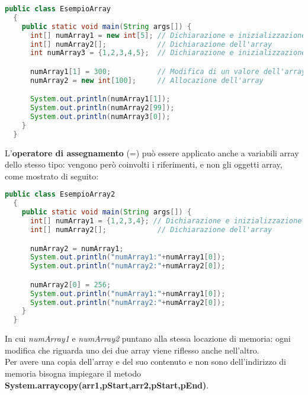 \documentclass[a4paper]{extarticle}
\begin{document}
\vspace{1em}
\noindent
\begin{lstlisting}[language=Java, caption=Esempio di array in Java]
  public class EsempioArray
  {
    public static void main(String args[]) {
      int[] numArray1 = new int[5]; // Dichiarazione e inizializzazione dell'array
      int[] numArray2[];            // Dichiarazione dell'array
      int numArray3 = {1,2,3,4,5};  // Dichiarazione e inizializzazione dell'array

      numArray1[1] = 300;           // Modifica di un valore dell'array
      numArray2 = new int[100];     // Allocazione dell'array

      System.out.println(numArray1[1]);
      System.out.println(numArray2[99]);
      System.out.println(numArray3[0]);
    }
  }
\end{lstlisting}

\vspace{1em}
\noindent
L’\textbf{operatore di assegnamento} (=) può essere applicato anche a variabili array dello stesso tipo: vengono però coinvolti i riferimenti, e non gli oggetti array, come mostrato di seguito:

\vspace{1em}
\noindent
\begin{lstlisting}[language=Java, caption=Operazioni di assegnamento tra array in Java]
  public class EsempioArray2
  {
    public static void main(String args[]) {
      int[] numArray1 = {1,2,3,4}; // Dichiarazione e inizializzazione dell'array
      int[] numArray2[];            // Dichiarazione dell'array

      numArray2 = numArray1;
      System.out.println("numArray1:"+numArray1[0]);
      System.out.println("numArray2:"+numArray2[0]);

      numArray2[0] = 256;
      System.out.println("numArray1:"+numArray1[0]);
      System.out.println("numArray2:"+numArray2[0]);
    }
  }
\end{lstlisting}

\vspace{1em}
\noindent
In cui \emph{numArray1} e \emph{numArray2} puntano alla stessa locazione di memoria: ogni modifica che riguarda uno dei due array viene riflesso anche nell'altro.\\
Per avere una copia dell'array e del suo contenuto e non sono dell'indirizzo di memoria bisogna impiegare il metodo \textbf{System.arraycopy(arr1,pStart,arr2,pStart,pEnd)}.

\vspace{1em}
\end{document}
